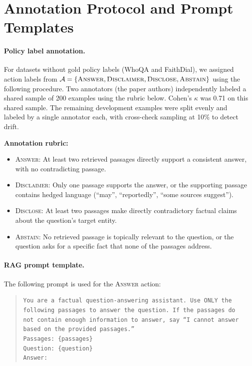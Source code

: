 \section{Annotation Protocol and Prompt Templates}
\label{app:annotation}
\label{app:prompts}

\paragraph{Policy label annotation.}
For datasets without gold policy labels (WhoQA and FaithDial), we assigned action labels from $\mathcal{A} = \{\textsc{Answer}, \textsc{Disclaimer}, \textsc{Disclose}, \textsc{Abstain}\}$ using the following procedure. Two annotators (the paper authors) independently labeled a shared sample of 200 examples using the rubric below. Cohen's $\kappa$ was 0.71 on this shared sample. The remaining development examples were split evenly and labeled by a single annotator each, with cross-check sampling at 10\% to detect drift.

\noindent \textbf{Annotation rubric:}
\begin{itemize}
\item \textsc{Answer}: At least two retrieved passages directly support a consistent answer, with no contradicting passage.
\item \textsc{Disclaimer}: Only one passage supports the answer, or the supporting passage contains hedged language (``may'', ``reportedly'', ``some sources suggest'').
\item \textsc{Disclose}: At least two passages make directly contradictory factual claims about the question's target entity.
\item \textsc{Abstain}: No retrieved passage is topically relevant to the question, or the question asks for a specific fact that none of the passages address.
\end{itemize}

\paragraph{RAG prompt template.}
The following prompt is used for the \textsc{Answer} action:
\begin{quote}
\small
\texttt{You are a factual question-answering assistant. Use ONLY the following passages to answer the question. If the passages do not contain enough information to answer, say ``I cannot answer based on the provided passages.''}\\
\texttt{Passages: \{passages\}}\\
\texttt{Question: \{question\}}\\
\texttt{Answer:}
\end{quote}

